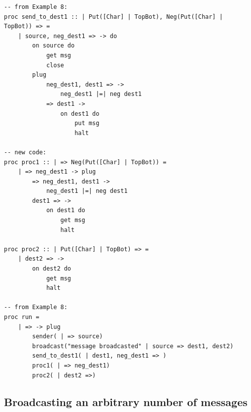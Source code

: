 \documentclass[11pt]{article}
\begin{document}
\begin{appendix}
\begin{lstlisting}
-- from Example 8:
proc send_to_dest1 :: | Put([Char] | TopBot), Neg(Put([Char] | TopBot)) => =
	| source, neg_dest1 => -> do
		on source do
			get msg
			close
		plug
			neg_dest1, dest1 => ->
				neg_dest1 |=| neg dest1
			=> dest1 ->
				on dest1 do	
					put msg
					halt
					
-- new code:
proc proc1 :: | => Neg(Put([Char] | TopBot)) =
	| => neg_dest1 -> plug
		=> neg_dest1, dest1 ->
			neg_dest1 |=| neg dest1
		dest1 => ->
			on dest1 do	
				get msg
				halt

proc proc2 :: | Put([Char] | TopBot) => =
	| dest2 => ->
		on dest2 do
			get msg
			halt

-- from Example 8:
proc run =
	| => -> plug
		sender( | => source)
		broadcast("message broadcasted" | source => dest1, dest2)
		send_to_dest1( | dest1, neg_dest1 => )
		proc1( | => neg_dest1)	
		proc2( | dest2 =>)
\end{lstlisting} 

\subsection{Broadcasting an arbitrary number of messages}
\label{prog:broadcastmsgs}


\end{appendix}
\end{document}
